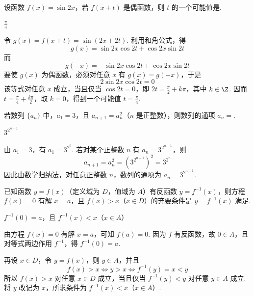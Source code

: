 \begin{problem}
设函数 \(f(x) = \sin 2x\)，若 \(f(x + t)\) 是偶函数，则 \(t\) 的一个可能值是\fillinblank{}.

\begin{answer}
\(\frac{\pi}{4}\)
\end{answer}

\begin{solution}
令 \(g(x)=f(x+t)=\sin(2x+2t)\). 利用和角公式，得
\[
g(x)=\sin2x\cos2t+\cos2x\sin2t
\]
而
\[
g(-x)=-\sin2x\cos2t+\cos2x\sin2t
\]
要使 \(g(x)\) 为偶函数，必须对任意 \(x\) 有 \(g(x)=g(-x)\)，于是
\[
2\sin2x\cos2t=0
\]
该等式对任意 \(x\) 成立，当且仅当 \(\cos2t=0\)，即 \(2t=\frac{\pi}{2}+k\pi\)，其中 \(k\in\Z\). 因而 \(t=\frac{\pi}{4}+\frac{k\pi}{2}\)，取 \(k=0\)，得到一个可能值 \(t=\frac{\pi}{4}\).
\end{solution}
\end{problem}

\begin{problem}
若数列 \(\{a_{n}\}\) 中，\(a_{1} = 3\)，且 \(a_{n+1} = a_{n}^{2}\)（\(n\) 是正整数），则数列的通项 \(a_{n} =\)\fillinblank{}.

\begin{answer}
\(3^{2^{n-1}}\)
\end{answer}

\begin{solution}
由 \(a_1=3\)，有 \(a_1=3^{2^0}\). 若对某个正整数 \(n\) 有 \(a_n=3^{2^{n-1}}\)，则
\[
a_{n+1}=a_n^2=\left(3^{2^{n-1}}\right)^2=3^{2^n}
\]
因此由数学归纳法，对任意正整数 \(n\)，数列的通项为 \(a_n=3^{2^{n-1}}\).
\end{solution}
\end{problem}

\begin{problem}
已知函数 \(y = f(x)\)（定义域为 \(D\)，值域为 \(A\)）有反函数 \(y = f^{-1}(x)\)，则方程 \(f(x) = 0\) 有解 \(x = a\)，且 \(f(x) > x\)（\(x \in D\)）的充要条件是 \(y = f^{-1}(x)\) 满足\fillinblank{}.

\begin{answer}
\(f^{-1}(0)=a\)，且 \(f^{-1}(x)<x\)（\(x\in A\)）
\end{answer}

\begin{solution}
由方程 \(f(x)=0\) 有解 \(x=a\)，可知 \(f(a)=0\). 因为 \(f\) 有反函数，故 \(0\in A\)，且对等式两边作用 \(f^{-1}\)，得 \(f^{-1}(0)=a\).

再设 \(x\in D\)，令 \(y=f(x)\)，则 \(y\in A\)，并且
\[
f(x)>x\Longleftrightarrow y>x\Longleftrightarrow f^{-1}(y)=x<y
\]
所以 \(f(x)>x\) 对任意 \(x\in D\) 成立，当且仅当 \(f^{-1}(y)<y\) 对任意 \(y\in A\) 成立. 将 \(y\) 改记为 \(x\)，所求条件为 \(f^{-1}(x)<x\)（\(x\in A\)）.
\end{solution}
\end{problem}

